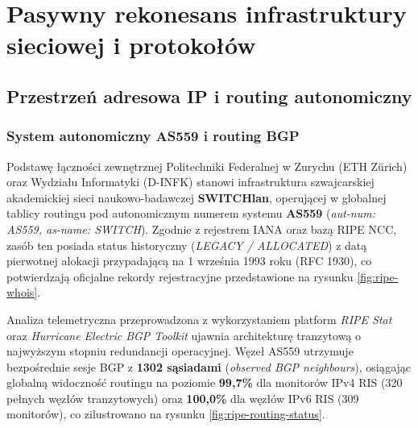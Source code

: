 \chapter{Pasywny rekonesans infrastruktury sieciowej i protokołów}\label{ch:infrastruktura}


\section{Przestrzeń adresowa IP i routing autonomiczny}\label{sec:asn-ip}

\subsection{System autonomiczny AS559 i routing BGP}\label{subsec:asn-bgp}

Podstawę łączności zewnętrznej Politechniki Federalnej w Zurychu (ETH Zürich) oraz Wydziału Informatyki (D-INFK) stanowi infrastruktura szwajcarskiej akademickiej sieci naukowo-badawczej \textbf{SWITCHlan}, operującej w globalnej tablicy routingu pod autonomicznym numerem systemu \textbf{AS559} (\textit{aut-num: AS559, as-name: SWITCH}). Zgodnie z rejestrem IANA oraz bazą RIPE NCC, zasób ten posiada status historyczny (\textit{LEGACY / ALLOCATED}) z datą pierwotnej alokacji przypadającą na 1 września 1993 roku (RFC 1930), co potwierdzają oficjalne rekordy rejestracyjne przedstawione na rysunku \ref{fig:ripe-whois}.


Analiza telemetryczna przeprowadzona z wykorzystaniem platform \textit{RIPE Stat} oraz \textit{Hurricane Electric BGP Toolkit} ujawnia architekturę tranzytową o najwyższym stopniu redundancji operacyjnej. Węzeł AS559 utrzymuje bezpośrednie sesje BGP z \textbf{1302 sąsiadami} (\textit{observed BGP neighbours}), osiągając globalną widoczność routingu na poziomie \textbf{99{,}7\%} dla monitorów IPv4 RIS (320 pełnych węzłów tranzytowych) oraz \textbf{100{,}0\%} dla węzłów IPv6 RIS (309 monitorów), co zilustrowano na rysunku \ref{fig:ripe-routing-status}.

